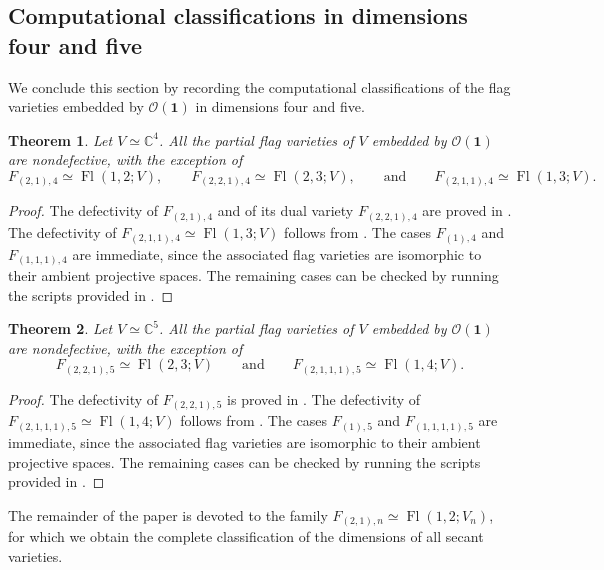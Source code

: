 \documentclass[a4paper,reqno]{amsart}
\theoremstyle{plainnopunct}
\newtheorem{theorem}{Theorem}[section]
\theoremstyle{definitionnopunct}
\newcommand{\C}{\mathbb{C}}
\newcommand{\cO}{\mathcal{O}}
\DeclareMathOperator{\Fl}{Fl}
\begin{document}
\subsection{Computational classifications in dimensions four and five}
We conclude this section by recording the computational
classifications of the flag varieties embedded by
$\cO(\mathbf 1)$ in dimensions four and five.

\begin{theorem}
\label{thm: classification flags dimension four}
Let $V\simeq\C^4$.
All the partial flag varieties of $V$ embedded by
$\cO(\mathbf 1)$ are nondefective, with the exception of
\[
F_{(2,1),4}
\simeq
\Fl(1,2;V),
\qquad
F_{(2,2,1),4}
\simeq
\Fl(2,3;V),
\qquad
\text{and}
\qquad
{
F_{(2,1,1),4}
\simeq
\Fl(1,3;V).
}
\]
\end{theorem}

\begin{proof}
The defectivity of $F_{(2,1),4}$
and of its dual variety
$F_{(2,2,1),4}
$
are proved in . The defectivity of
$F_{(2,1,1),4}\simeq\Fl(1,3;V)$ follows from
\cite[Corollary~1.2]{Baur2004}. The cases $F_{(1),4}$ and $F_{(1,1,1),4}$ are immediate, since the associated flag varieties are isomorphic to their ambient projective spaces. The remaining cases can be checked by running the scripts  provided in \cite{Repo}.
\end{proof}

\begin{theorem}
\label{thm: classification flags dimension five}
Let $V\simeq\C^5$.
All the partial flag varieties of $V$ embedded by
$\cO(\mathbf 1)$ are nondefective, with the exception of
\[
F_{(2,2,1),5}
\simeq
\Fl(2,3;V)
\qquad
\text{and}
\qquad
F_{(2,1,1,1),5}
\simeq
\Fl(1,4;V).
\]
\end{theorem}

\begin{proof}
The defectivity of
$F_{(2,2,1),5}$
is proved in . The defectivity of
$F_{(2,1,1,1),5}
\simeq
\Fl(1,4;V)$
follows from
\cite[Corollary~1.2]{Baur2004}. The cases $F_{(1),5}$ and $F_{(1,1,1,1),5}$ are immediate, since the associated flag varieties are isomorphic to their ambient projective spaces. The remaining cases can be checked by running the scripts  provided in \cite{Repo}.
\end{proof}

The remainder of the paper is devoted to the family $F_{(2,1),n}
\simeq
\Fl(1,2;V_n)$,
for which we obtain the complete classification of the dimensions of
all secant varieties.
\end{document}
